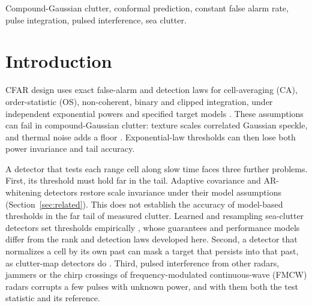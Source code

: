 \documentclass[journal]{IEEEtran}
\begin{document}
\begin{IEEEkeywords}
Compound-Gaussian clutter, conformal prediction, constant false alarm rate, pulse integration, pulsed interference, sea clutter.
\end{IEEEkeywords}

\section{Introduction}
 CFAR design uses exact false-alarm and detection laws for cell-averaging (CA), order-statistic (OS), non-coherent, binary and clipped integration, under independent exponential powers and specified target models \cite{finn1968,rohling1983,gandhi1988,richards2014,abbasi2018clip}. These assumptions can fail in compound-Gaussian clutter: texture scales correlated Gaussian speckle, and thermal noise adds a floor \cite{ward2013,conte1995,ollila2012}. Exponential-law thresholds can then lose both power invariance and tail accuracy.

A detector that tests each range cell along slow time faces three further problems. First, its threshold must hold far in the tail. Adaptive covariance and AR-whitening detectors restore scale invariance under their model assumptions (Section~\ref{sec:related}). This does not establish the accuracy of model-based thresholds in the far tail of measured clutter. Learned and resampling sea-clutter detectors set thresholds empirically \cite{bai2026cvae,rouzoumka2026ood,qu2023sensors,qu2024sieve,qu2026sact}, whose guarantees and performance models differ from the rank and detection laws developed here. Second, a detector that normalizes a cell by its own past can mask a target that persists into that past, as clutter-map detectors do \cite{lops1989,naldi1999}. Third, pulsed interference from other radars, jammers or the chirp crossings of frequency-modulated continuous-wave (FMCW) radars corrupts a few pulses with unknown power, and with them both the test statistic and its reference.
\end{document}
